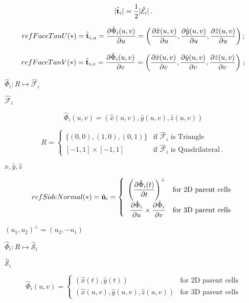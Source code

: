 \documentclass{article}
\begin{document}
\[
        |\hat{\bf t}_i | = {1\over 2} |\hat{\mathcal E}_i |\,.
\]
\pagebreak

\[
        {refFaceTanU}(*) = \hat{\bf t}_{i,u} = {\partial\hat{\Phi}_i(u,v)\over\partial u} = 
        \left({\partial\hat{x}(u,v)\over\partial u}, 
              {\partial\hat{y}(u,v)\over\partial u},
              {\partial\hat{z}(u,v)\over\partial u} \right) ;
\]
\pagebreak

\[
        {refFaceTanV}(*) = \hat{\bf t}_{i,v} = {\partial\hat{\Phi}_i(u,v)\over \partial v} = 
        \left({\partial\hat{x}(u,v)\over\partial v}, 
              {\partial\hat{y}(u,v)\over\partial v},
              {\partial\hat{z}(u,v)\over\partial v} \right)\,;
\]
\pagebreak

$\hat{\Phi}_i: R \mapsto \hat{\mathcal F}_i$
\pagebreak

$\hat{\mathcal F}_i$
\pagebreak

\[
       \hat{\Phi}_i(u,v) =(\hat{x}(u,v),\hat{y}(u,v),\hat{z}(u,v))
\]
\pagebreak

\[
        R = \left\{\begin{array}{rl} 
            \{(0,0),(1,0),(0,1)\} & \mbox{if $\hat{\mathcal F}_i$  is Triangle} \\[1ex]
              [-1,1]\times [-1,1] & \mbox{if $\hat{\mathcal F}_i$ is Quadrilateral} \,.
            \end{array}\right.
\]
\pagebreak

$\hat{x},\hat{y},\hat{z}$
\pagebreak

\[
        {refSideNormal}(*) = \hat{\bf n}_i =
        \left\{\begin{array}{rl} 
            \displaystyle
            \left({\partial\hat{\Phi}_i(t)\over\partial t}\right)^{\perp} 
                                                      & \mbox{for 2D parent cells} \\[2ex]
            \displaystyle
            {\partial\hat{\Phi}_{i}\over\partial u} \times 
            {\partial\hat{\Phi}_{i}\over\partial v}   & \mbox{for 3D parent cells} 
        \end{array}\right.
\]
\pagebreak

$ (u_1,u_2)^\perp = (u_2, -u_1)$
\pagebreak

$\hat{\Phi}_i: R \mapsto \hat{\mathcal S}_i$
\pagebreak

$\hat{\mathcal S}_i$
\pagebreak

\[
        \hat{\Phi}_i(u,v) = 
          \left\{\begin{array}{rl}
            (\hat{x}(t),\hat{y}(t))                   & \mbox{for 2D parent cells} \\[1ex]
            (\hat{x}(u,v),\hat{y}(u,v),\hat{z}(u,v))  & \mbox{for 3D parent cells}
        \end{array}\right.
  
\]
\pagebreak
\end{document}
